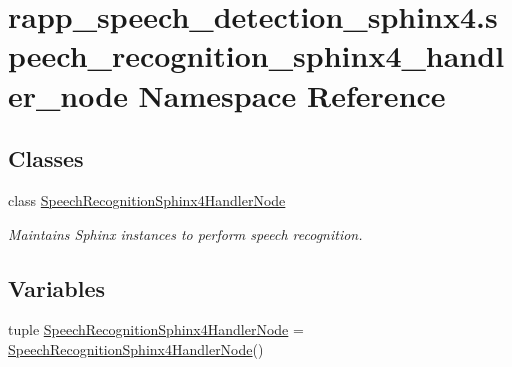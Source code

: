 \hypertarget{namespacerapp__speech__detection__sphinx4_1_1speech__recognition__sphinx4__handler__node}{\section{rapp\-\_\-speech\-\_\-detection\-\_\-sphinx4.\-speech\-\_\-recognition\-\_\-sphinx4\-\_\-handler\-\_\-node Namespace Reference}
\label{namespacerapp__speech__detection__sphinx4_1_1speech__recognition__sphinx4__handler__node}
}
\subsection*{Classes}
\begin{DoxyCompactItemize}
\item 
class \hyperlink{classrapp__speech__detection__sphinx4_1_1speech__recognition__sphinx4__handler__node_1_1SpeechRecognitionSphinx4HandlerNode}{Speech\-Recognition\-Sphinx4\-Handler\-Node}
\begin{DoxyCompactList}\small\item\em Maintains Sphinx instances to perform speech recognition. \end{DoxyCompactList}\end{DoxyCompactItemize}
\subsection*{Variables}
\begin{DoxyCompactItemize}
\item 
tuple \hyperlink{namespacerapp__speech__detection__sphinx4_1_1speech__recognition__sphinx4__handler__node_ace55376f7271074fc9bcd18214509dbc}{Speech\-Recognition\-Sphinx4\-Handler\-Node} = \hyperlink{classrapp__speech__detection__sphinx4_1_1speech__recognition__sphinx4__handler__node_1_1SpeechRecognitionSphinx4HandlerNode}{Speech\-Recognition\-Sphinx4\-Handler\-Node}()
\end{DoxyCompactItemize}


